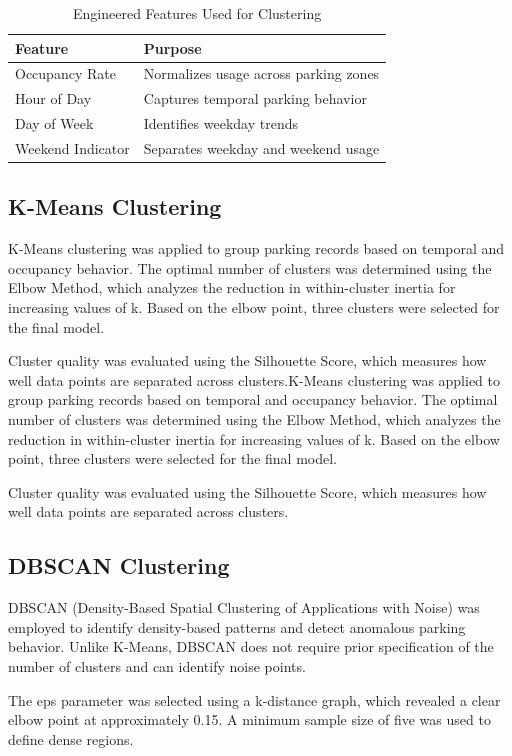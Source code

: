 \documentclass[conference]{IEEEtran}
\begin{document}
\begin{table}[htbp]
\caption{Engineered Features Used for Clustering}
\centering
\begin{tabular}{ll}
\toprule
\textbf{Feature} & \textbf{Purpose} \\
\midrule
Occupancy Rate & Normalizes usage across parking zones \\
Hour of Day & Captures temporal parking behavior \\
Day of Week & Identifies weekday trends \\
Weekend Indicator & Separates weekday and weekend usage \\
\bottomrule
\end{tabular}
\label{tab:features}
\end{table}

\subsection{K-Means Clustering}\label{AA}
K-Means clustering was applied to group parking records based on temporal and occupancy behavior. The optimal number of clusters was determined using the Elbow Method, which analyzes the reduction in within-cluster inertia for increasing values of k. Based on the elbow point, three clusters were selected for the final model.

Cluster quality was evaluated using the Silhouette Score, which measures how well data points are separated across clusters.K-Means clustering was applied to group parking records based on temporal and occupancy behavior. The optimal number of clusters was determined using the Elbow Method, which analyzes the reduction in within-cluster inertia for increasing values of k. Based on the elbow point, three clusters were selected for the final model.

Cluster quality was evaluated using the Silhouette Score, which measures how well data points are separated across clusters.

\subsection{DBSCAN Clustering}
DBSCAN (Density-Based Spatial Clustering of Applications with Noise) was employed to identify density-based patterns and detect anomalous parking behavior. Unlike K-Means, DBSCAN does not require prior specification of the number of clusters and can identify noise points.

The eps parameter was selected using a k-distance graph, which revealed a clear elbow point at approximately 0.15. A minimum sample size of five was used to define dense regions.
\end{document}
